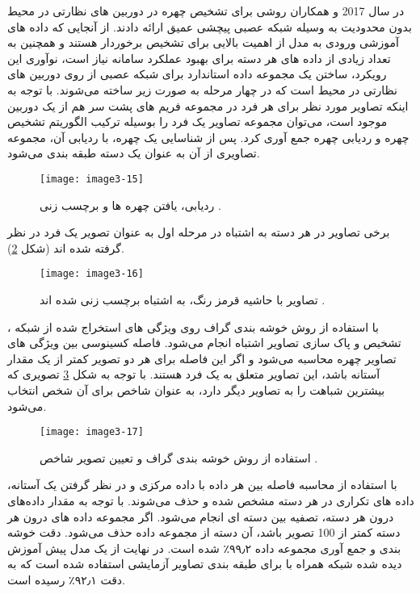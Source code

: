 \noindent
در سال 2017  و همکاران \cite{7984553} روشی برای تشخیص چهره در دوربین های نظارتی در محیط بدون محدودیت به وسیله شبكه عصبی پیچشی عمیق ارائه دادند. از آنجایی که داده های آموزشی ورودی به مدل از اهمیت بالایی برای تشخیص برخوردار هستند و همچنین به تعداد زیادی از داده های هر دسته برای بهبود عملكرد سامانه نیاز است، نوآوری  این رویکرد، ساختن یک مجموعه داده استاندارد برای شبكه عصبی از روی دوربین های نظارتی در محیط است که در چهار مرحله به صورت زیر ساخته می‌شوند.
\noindent
با توجه به اینكه تصاویر مورد نظر برای هر فرد در مجموعه فریم های پشت سر هم از یک دوربین موجود است، می‌توان مجموعه تصاویر یک فرد را بوسیله ترکیب الگوریتم تشخیص چهره و ردیابی چهره جمع آوری کرد. پس از شناسایی یک چهره، با ردیابی آن، مجموعه تصاویری از آن به عنوان یک دسته طبقه بندی می‌شود.

\begin{figure}[h]
\centering
  \texttt{[image: image3-15]}
  \caption{ردیابی، یافتن چهره ها و برچسب زنی \cite{7984553}.}
  \label{image2-1}
\end{figure}

\noindent
	برخی تصاویر در هر دسته به اشتباه در مرحله اول به عنوان تصویر یک فرد در نظر گرفته شده اند (شکل \ref{image3-16}).

\begin{figure}[h]
\centering
  \texttt{[image: image3-16]}
  \caption{تصاویر با حاشیه قرمز رنگ، به اشتباه برچسب زنی شده اند \cite{7984553}.}
  \label{image3-16}
\end{figure}

\noindent
با استفاده از روش خوشه بندی گراف  روی ویژگی های استخراج شده از شبكه ، تشخیص و پاک سازی تصاویر اشتباه انجام می‌شود. فاصله کسینوسی بین ویژگی های تصاویر چهره محاسبه می‌شود و اگر این فاصله برای هر دو تصویر کمتر از یک مقدار آستانه باشد، این تصاویر متعلق به یک فرد هستند. با توجه به شکل \ref{image3-17} تصویری که بیشترین شباهت را به تصاویر دیگر دارد، به عنوان شاخص برای آن شخص انتخاب می‌شود.

\begin{figure}[h]
\centering
  \texttt{[image: image3-17]}
  \caption{ استفاده از روش خوشه بندی گراف و تعیین تصویر شاخص \cite{7984553}.}
  \label{image3-17}
\end{figure}

\noindent
	با استفاده از محاسبه فاصله بین هر داده با داده مرکزی و در نظر گرفتن یک آستانه، داده های تكراری در هر دسته مشخص شده و حذف می‌شوند. با توجه به مقدار داده‌های درون هر دسته، تصفیه بین دسته ای انجام می‌شود. اگر مجموعه داده های درون هر دسته کمتر از 100 تصویر باشد، آن دسته از مجموعه داده حذف می‌شود. دقت خوشه بندی و جمع آوری مجموعه داده ۹۹٫۲٪ شده است. در نهایت از یک مدل پیش آموزش دیده شده شبكه  همراه با  برای طبقه بندی تصاویر آزمایشی استفاده شده است که به دقت ۹۲٫۱٪ رسیده است.

